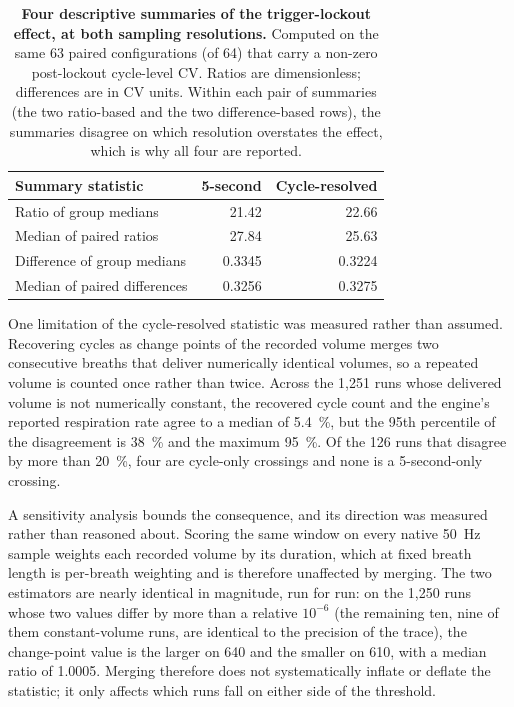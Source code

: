 \documentclass[pdflatex,sn-nature]{sn-jnl}%
\begin{document}
\begin{table}[htbp]
\centering
\caption{\textbf{Four descriptive summaries of the trigger-lockout effect, at both sampling resolutions.} Computed on the same 63 paired configurations (of 64) that carry a non-zero post-lockout cycle-level CV. Ratios are dimensionless; differences are in CV units. Within each pair of summaries (the two ratio-based and the two difference-based rows), the summaries disagree on which resolution overstates the effect, which is why all four are reported.}
\label{tab:s8-estimands}
\begin{tabular}{lrr}
\toprule
Summary statistic & 5-second & Cycle-resolved \\
\midrule
Ratio of group medians & 21.42 & 22.66 \\
Median of paired ratios & 27.84 & 25.63 \\
Difference of group medians & 0.3345 & 0.3224 \\
Median of paired differences & 0.3256 & 0.3275 \\
\bottomrule
\end{tabular}
\end{table}

One limitation of the cycle-resolved statistic was measured rather than assumed. Recovering cycles as change points of the recorded volume merges two consecutive breaths that deliver numerically identical volumes, so a repeated volume is counted once rather than twice. Across the 1{,}251 runs whose delivered volume is not numerically constant, the recovered cycle count and the engine's reported respiration rate agree to a median of 5.4~\%, but the 95th percentile of the disagreement is 38~\% and the maximum 95~\%. Of the 126 runs that disagree by more than 20~\%, four are cycle-only crossings and none is a 5-second-only crossing.

A sensitivity analysis bounds the consequence, and its direction was measured rather than reasoned about. Scoring the same window on every native 50~Hz sample weights each recorded volume by its duration, which at fixed breath length is per-breath weighting and is therefore unaffected by merging. The two estimators are nearly identical in magnitude, run for run: on the 1{,}250 runs whose two values differ by more than a relative $10^{-6}$ (the remaining ten, nine of them constant-volume runs, are identical to the precision of the trace), the change-point value is the larger on 640 and the smaller on 610, with a median ratio of 1.0005. Merging therefore does not systematically inflate or deflate the statistic; it only affects which runs fall on either side of the threshold.
\end{document}

